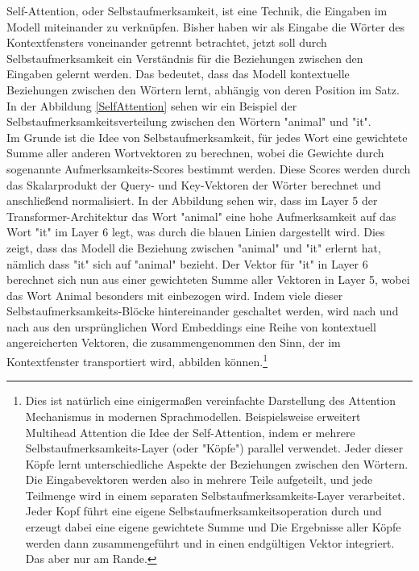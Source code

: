 Self-Attention, oder Selbstaufmerksamkeit, ist eine Technik, die Eingaben im Modell miteinander zu verknüpfen. Bisher haben wir als Eingabe die Wörter des Kontextfensters voneinander getrennt betrachtet, jetzt soll durch Selbstaufmerksamkeit ein Verständnis für die Beziehungen zwischen den Eingaben gelernt werden. Das bedeutet, dass das Modell kontextuelle Beziehungen zwischen den Wörtern lernt, abhängig von deren Position im Satz. In der Abbildung \ref{SelfAttention} sehen wir ein Beispiel der Selbstaufmerksamkeitsverteilung zwischen den Wörtern "animal" und "it".\\

Im Grunde ist die Idee von Selbstaufmerksamkeit, für jedes Wort eine gewichtete Summe aller anderen Wortvektoren zu berechnen, wobei die Gewichte durch sogenannte Aufmerksamkeits-Scores bestimmt werden. Diese Scores werden durch das Skalarprodukt der Query- und Key-Vektoren der Wörter berechnet und anschließend normalisiert. In der Abbildung sehen wir, dass im Layer 5 der Transformer-Architektur das Wort "animal" eine hohe Aufmerksamkeit auf das Wort "it" im Layer 6 legt, was durch die blauen Linien dargestellt wird. Dies zeigt, dass das Modell die Beziehung zwischen "animal" und "it" erlernt hat, nämlich dass "it" sich auf "animal" bezieht. Der Vektor für "it" in Layer 6 berechnet sich nun aus einer gewichteten Summe aller Vektoren in Layer 5, wobei das Wort Animal besonders mit einbezogen wird. Indem viele dieser Selbstaufmerksamkeits-Blöcke hintereinander geschaltet werden, wird nach und nach aus den ursprünglichen Word Embeddings eine Reihe von kontextuell angereicherten Vektoren, die zusammengenommen den Sinn, der im Kontextfenster transportiert wird, abbilden können.\footnote{Dies ist natürlich eine einigermaßen vereinfachte Darstellung des Attention Mechanismus in modernen Sprachmodellen. Beispielsweise erweitert Multihead Attention die Idee der Self-Attention, indem er mehrere Selbstaufmerksamkeits-Layer (oder "Köpfe") parallel verwendet. Jeder dieser Köpfe lernt unterschiedliche Aspekte der Beziehungen zwischen den Wörtern. Die Eingabevektoren werden also in mehrere Teile aufgeteilt, und jede Teilmenge wird in einem separaten Selbstaufmerksamkeits-Layer verarbeitet. Jeder Kopf führt eine eigene Selbstaufmerksamkeitsoperation durch und erzeugt dabei eine eigene gewichtete Summe und Die Ergebnisse aller Köpfe werden dann zusammengeführt und in einen endgültigen Vektor integriert. Das aber nur am Rande.} \\

